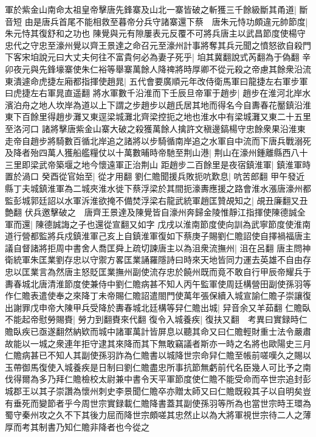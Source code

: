 軍於紫金山南命太祖皇帝擊唐先鋒寨及山北一寨皆破之斬獲三千餘級斷其甬道|{
	斷音短}
由是唐兵首尾不能相救至暮帝分兵守諸寨還下蔡　唐朱元恃功頗違元帥節度|{
	朱元恃其復舒和之功也}
陳覺與元有隙屢表元反覆不可將兵唐主以武昌節度使楊守忠代之守忠至濠州覺以齊王景達之命召元至濠州計事將奪其兵元聞之憤怒欲自殺門下客宋垍說元曰大丈夫何往不富貴何必為妻子死乎|{
	垍其冀翻說式芮翻為于偽翻}
辛卯夜元與先鋒壕寨使朱仁裕等舉寨萬餘人降禆將時厚卿不從元殺之帝慮其餘衆沿流東潰遽命虎捷左廂都指揮使趙晁|{
	五代會要廣順元年改侍衛馬軍曰龍捷左右軍步軍曰虎捷左右軍晁直遥翻}
將水軍數千沿淮而下壬辰旦帝軍于趙步|{
	趙步在淮河北岸水濱泊舟之地人坎岸為道以上下謂之步趙步以趙氏居其地而得名今自夀春花靨鎮沿淮東下百餘里得趙步灘又東逕梁城灘北齊梁控扼之地也淮水中有梁城灘又東二十五里至洛河口}
諸將擊唐紫金山寨大破之殺獲萬餘人擒許文稹邊鎬楊守忠餘衆果沿淮東走帝自趙步將騎數百循北岸追之諸將以步騎循南岸追之水軍自中流而下唐兵戰溺死及降者殆四萬人獲船艦糧仗以十萬數晡時帝馳至荆山港|{
	荆山在濠州鍾離縣西八十三里即梁武帝築堰之地今懷遠軍正治荆山}
距趙步二百餘里是夜宿鎮淮軍|{
	鎮淮軍時置於渦口}
癸酉從官始至|{
	從才用翻}
劉仁贍聞援兵敗扼吭歎息|{
	吭苦郎翻}
甲午發近縣丁夫城鎮淮軍為二城夾淮水徙下蔡浮梁於其間扼濠夀應援之路會淮水漲唐濠州都監彭城郭廷詔以水軍泝淮欲掩不備焚浮梁右龍武統軍趙匡贊覘知之|{
	覘丑廉翻又丑艶翻}
伏兵邀擊破之　唐齊王景達及陳覺皆自濠州奔歸金陵惟靜江指揮使陳德誠全軍而還|{
	陳德誠誨之子也還從宣翻又如字}
戊戌以淮南節度使向訓為武寧節度使淮南道行營都監將兵戍鎮淮軍己亥上自鎮淮軍復如下蔡庚子賜劉仁贍詔使自擇禍福唐主議自督諸將拒周中書舍人喬匡舜上疏切諫唐主以為沮衆流撫州|{
	沮在呂翻}
唐主問神衛統軍朱匡業劉存忠以守禦方畧匡業誦羅隱詩曰時來天地皆同力運去英雄不自由存忠以匡業言為然唐主怒貶匡業撫州副使流存忠於饒州既而竟不敢自行甲辰帝耀兵于夀春城北唐清淮節度使兼侍中劉仁贍病甚不知人丙午監軍使周廷構營田副使孫羽等作仁贍表遣使奉之來降丁未帝賜仁贍詔遣閤門使萬年張保續入城宣諭仁贍子崇讓復出謝罪戊申帝大陳甲兵受降於夀春城北廷構等舁仁贍出城|{
	舁音余又羊茹翻}
仁贍臥不能起帝慰勞賜賚|{
	勞力到翻賚來代翻}
復令入城養疾|{
	復扶又翻　考異曰實録時仁贍臥疾已亟遂翻然納欵而城中諸軍萬計皆屏息以聽其命又曰仁贍輕財重士法令嚴肅故能以一城之衆連年拒守逮其來降而其下無敢竊議者斯亦一時之名將也歐陽史三月仁贍病甚已不知人其副使孫羽詐為仁贍書以城降世宗命舁仁贍至帳前嗟嘆久之賜以玉帶御馬復使入城養疾是日制曰劉仁贍盡忠所事抗節無虧前代名臣幾人可比予之南伐得爾為多乃拜仁贍檢校太尉兼中書令天平軍節度使仁贍不能受命而卒世宗追封彭城郡王以其子崇讚為懷州刺史李景聞仁贍卒亦贈太師又曰仁贍既殺其子以自明矣豈有垂死而變節者乎今周世宗實録載仁贍降書蓋其副使孫羽等所為也當世宗時王環為蜀守秦州攻之久不下其後力屈而降世宗頗嗟其忠然止以為大將軍視世宗待二人之薄厚而考其制書乃知仁贍非降者也今從之}
